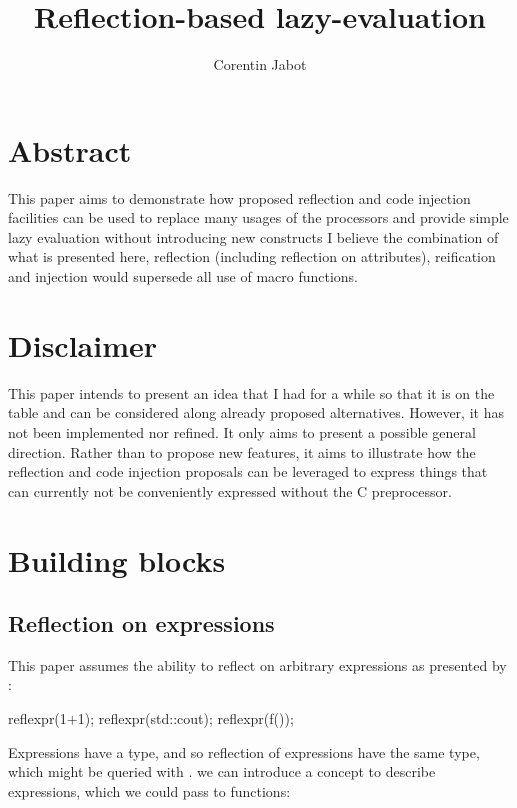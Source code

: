 \documentclass{wg21}
\title{Reflection-based lazy-evaluation}
\author{Corentin Jabot}{corentin.jabot@gmail.com}
\begin{document}
\maketitle


\section{Abstract}

This paper aims to demonstrate how proposed reflection and code injection facilities can be used to replace many usages of the processors
and provide simple lazy evaluation without introducing new constructs
I believe the combination of what is presented here, reflection (including reflection on attributes), reification and injection would supersede all use of macro functions.

\section{Disclaimer}

This paper intends to present an idea that I had for a while so that it is on the table and can be considered along already proposed alternatives.
However, it has not been implemented nor refined. It only aims to present a possible general direction.
Rather than to propose new features, it aims to illustrate how the reflection and code injection proposals can be leveraged to express things that can currently
not be conveniently expressed without the C preprocessor. 

\section{Building blocks}

\subsection{Reflection on expressions}

This paper assumes the ability to reflect on arbitrary expressions as presented by \cite{P1240R1}:
\begin{colorblock}
    reflexpr(1+1);
    reflexpr(std::cout);
    reflexpr(f());
\end{colorblock}

Expressions have a type, and so reflection of expressions have the same type, which might be queried with .
we can introduce a concept to describe expressions, which we could pass to  functions:
\end{document}
